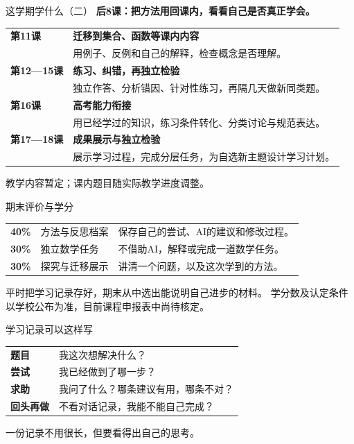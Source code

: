 \documentclass[aspectratio=169,10pt]{beamer}
\newcommand{\key}[1]{{\color{campusgreen}\bfseries #1}}
\newcommand{\smallbody}{\fontsize{11}{15}\selectfont}
\begin{document}
\begin{frame}[t,label=outlinetwo]{这学期学什么（二）}
  \smallbody
  \key{后8课：把方法用回课内，看看自己是否真正学会。}
  \par\vspace{3mm}
  \begin{tabular}{@{}lp{113mm}@{}}
    \key{第11课} & \textbf{迁移到集合、函数等课内内容}\\[1mm]
                  & 用例子、反例和自己的解释，检查概念是否理解。\\[2mm]
    \key{第12—15课} & \textbf{练习、纠错，再独立检验}\\[1mm]
                     & 独立作答、分析错因、针对性练习，再隔几天做新同类题。\\[2mm]
    \key{第16课} & \textbf{高考能力衔接}\\[1mm]
                  & 用已经学过的知识，练习条件转化、分类讨论与规范表达。\\[2mm]
    \key{第17—18课} & \textbf{成果展示与独立检验}\\[1mm]
                     & 展示学习过程，完成分层任务，为自选新主题设计学习计划。\\
  \end{tabular}
  \vfill
  {\fontsize{9}{12}\selectfont 教学内容暂定；课内题目随实际教学进度调整。}
\end{frame}

\begin{frame}[t]{期末评价与学分}
  \renewcommand{\arraystretch}{1.5}
  \begin{tabular}{@{}llp{72mm}@{}}
    \key{40\%} & 方法与反思档案 & 保存自己的尝试、AI的建议和修改过程。\\
    \key{30\%} & 独立数学任务 & 不借助AI，解释或完成一道数学任务。\\
    \key{30\%} & 探究与迁移展示 & 讲清一个问题，以及这次学到的方法。\\
  \end{tabular}\par
  \vspace{7mm}
  平时把学习记录存好，期末从中选出能说明自己进步的材料。
  \vfill
  {\smallbody 学分数及认定条件以学校公布为准，目前课程申报表中尚待核定。}
\end{frame}

\begin{frame}[t]{学习记录可以这样写}
  \begin{tabular}{@{}lp{114mm}@{}}
    \key{题目} & 我这次想解决什么？\\[5mm]
    \key{尝试} & 我已经做到了哪一步？\\[5mm]
    \key{求助} & 我问了什么？哪条建议有用，哪条不对？\\[5mm]
    \key{回头再做} & 不看对话记录，我能不能自己完成？\\
  \end{tabular}
  \vfill
  一份记录不用很长，但要看得出自己的思考。
\end{frame}
\end{document}

